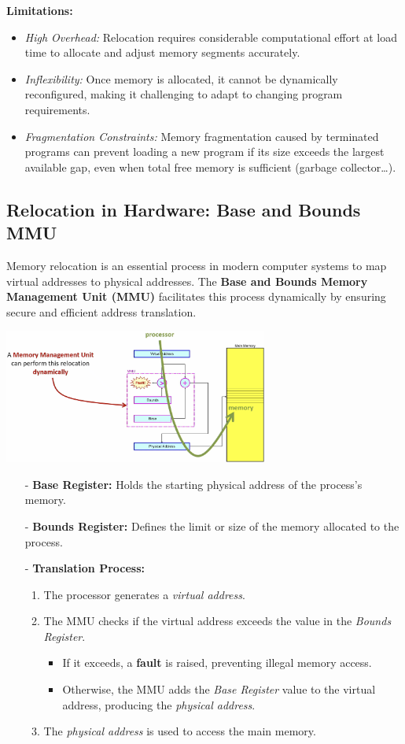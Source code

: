 \textbf{Limitations:}
\begin{itemize}
    \item \textit{High Overhead:} Relocation requires considerable computational effort at load time to allocate and adjust memory segments accurately.
    \item \textit{Inflexibility:} Once memory is allocated, it cannot be dynamically reconfigured, making it challenging to adapt to changing program requirements.
    \item \textit{Fragmentation Constraints:} Memory fragmentation caused by terminated programs can prevent loading a new program if its size exceeds the largest available gap, even when total free memory is sufficient (garbage collector\dots).
\end{itemize}
\subsection{Relocation in Hardware: Base and Bounds MMU}
Memory relocation is an essential process in modern computer systems to map virtual addresses to physical addresses. The \textbf{Base and Bounds Memory Management Unit (MMU)} facilitates this process dynamically by ensuring secure and efficient address translation.
\begin{center}
    \includegraphics[width=0.65\textwidth]{chapters/chapter3c/images/MMU.png}
\end{center}
\begin{itemize}
    \item[-] \textbf{Base Register:} Holds the starting physical address of the process's memory.
    \item[-] \textbf{Bounds Register:} Defines the limit or size of the memory allocated to the process.
    \item[-] \textbf{Translation Process:}
    \begin{enumerate}
        \item The processor generates a \textit{virtual address}.
        \item The MMU checks if the virtual address exceeds the value in the \textit{Bounds Register}.
        \begin{itemize}
            \item If it exceeds, a \textbf{fault} is raised, preventing illegal memory access.
            \item Otherwise, the MMU adds the \textit{Base Register} value to the virtual address, producing the \textit{physical address}.
        \end{itemize}
        \item The \textit{physical address} is used to access the main memory.
    \end{enumerate}
\end{itemize}

